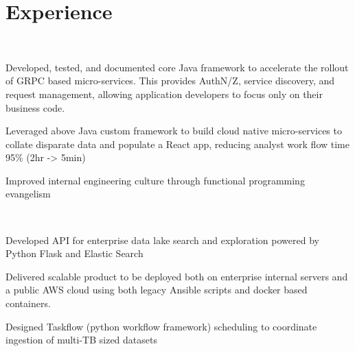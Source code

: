\documentclass[letterpaper]{deedy-resume-openfont} %
\begin{document}
%
\begin{minipage}[t]{0.66\textwidth} %


\section{Experience}

\\

\vspace{\topsep} %
\begin{tightitemize}
\item Developed, tested, and documented core Java framework to accelerate the rollout of GRPC based micro-services. This provides AuthN/Z, service discovery, and request management, allowing application developers to focus only on their business code.
\item Leveraged above Java custom framework to build cloud native micro-services to collate disparate data and populate a React app, reducing analyst work flow time 95\% (2hr -> 5min)
\item Improved internal engineering culture through functional programming evangelism 

\end{tightitemize}
\sectionspace %

\\

\begin{tightitemize}
\item Developed API for enterprise data lake search and exploration powered by Python Flask and Elastic Search
\item Delivered scalable product to be deployed both on enterprise internal servers and a public AWS cloud using both legacy
Ansible scripts and docker based containers. 
\item Designed Taskflow (python workflow framework) scheduling to coordinate ingestion of multi-TB sized datasets


\end{tightitemize}
\end{minipage}
\end{document}
